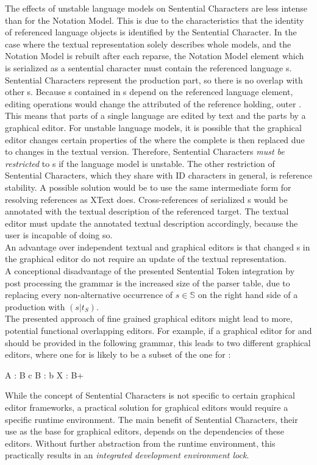 The effects of unstable language models on Sentential Characters are less intense than for the Notation Model. This is due to the characteristics that the identity of referenced language objects is identified by the Sentential Character. In the case where the textual representation solely describes whole models, and the Notation Model is rebuilt after each reparse, the Notation Model element which is serialized as a sentential character must contain the referenced language s. Sentential Characters represent the production part, so there is no overlap with other s. Because s contained in s depend on the referenced language element, editing operations would change the attributed  of the reference holding, outer . This means that parts of a single language  are edited by text and the parts by a graphical editor. For unstable language models, it is possible that the graphical editor changes certain properties of the  where the complete  is then replaced due to changes in the textual version. Therefore, Sentential Characters \emph{must be restricted }to s if the language model is unstable. The other restriction of Sentential Characters, which they share with ID characters in general, is reference stability. A possible solution would be to use the same intermediate form for resolving references as XText does. Cross-references of serialized s would be annotated with the textual description of the referenced target. The textual editor must update the annotated textual description accordingly, because the user is incapable of doing so. \\
An advantage over independent textual and graphical editors is that changed s in the graphical editor do not require an update of the textual representation.\\
A conceptional disadvantage of the presented Sentential Token integration by post processing the grammar is the increased size of the parser table, due to replacing every non-alternative occurrence of $s \in \mathbb{S}$ on the right hand side of a production with $(s | t_S)$. \\
The presented approach of fine grained graphical editors might lead to more, potential functional overlapping editors. For example, if a graphical editor for  and  should be provided in the following grammar, this leads to two different graphical editors, where one for  is likely to be a subset of the one for :
\begin{xtxt}
A : B c
B : b
X : B+
\end{xtxt}
While the concept of Sentential Characters is not specific to certain graphical editor frameworks, a practical solution for graphical editors would require a specific runtime environment. The main benefit of Sentential Characters, their use as the base for graphical editors, depends on the dependencies of these editors. Without further abstraction from the runtime environment, this practically results in an \emph{integrated development environment lock}.